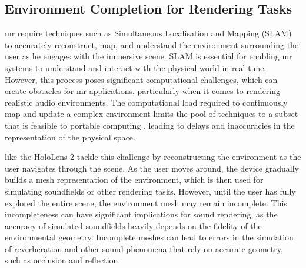 \subsection{Environment Completion for Rendering Tasks}\label{sec:env-completion-concept}
\acrshort{mr}  require techniques such as Simultaneous Localisation and Mapping (SLAM) to accurately reconstruct, map, and understand the environment surrounding the user as he engages with the immersive scene. SLAM is essential for enabling \acrshort{mr} systems to understand and interact with the physical world in real-time. However, this process poses significant computational challenges, which can create obstacles for \acrshort{mr} applications, particularly when it comes to rendering realistic audio environments. The computational load required to continuously map and update a complex environment limits the pool of techniques to a subset that is feasible to portable computing \citep{saeedi2018navigating,palazzolo2019refusion}, leading to delays and inaccuracies in the representation of the physical space.\par
{} like the HoloLens 2 tackle this challenge by reconstructing the environment as the user navigates through the scene. As the user moves around, the device gradually builds a mesh representation of the environment, which is then used for simulating soundfields or other rendering tasks. However, until the user has fully explored the entire scene, the environment mesh may remain incomplete. This incompleteness can have significant implications for sound rendering, as the accuracy of simulated soundfields heavily depends on the fidelity of the environmental geometry. Incomplete meshes can lead to errors in the simulation of reverberation and other sound phenomena that rely on accurate geometry, such as occlusion and reflection.\par


